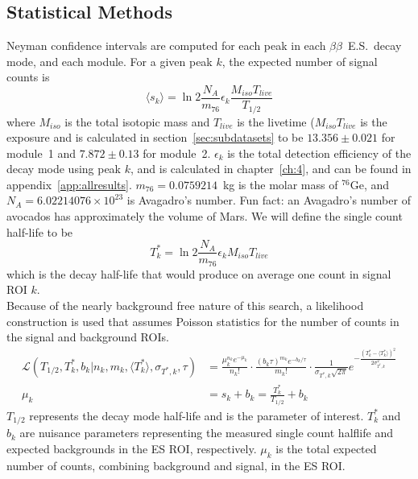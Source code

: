 \documentclass[notitlepage,rmp,aps,10pt]{revtex4-1}
\newcommand{\bb}{${\beta \beta}$}
\newcommand{\bbes}{\bb~E.S.}
\newcommand{\iso}[2]{$^{#1}$#2}
\newcommand{\Ge}[1]{\iso{#1}{Ge}}
\begin{document}
\subsection{Statistical Methods}
Neyman confidence intervals are computed for each peak in each \bbes\ decay mode, and each module.
For a given peak $k$, the expected number of signal counts is
\begin{equation}
  \langle s_k\rangle = \ln2 \frac{N_A}{m_{76}}\epsilon_k\frac{M_{iso}T_{live}}{T_{1/2}}
\end{equation}
where $M_{iso}$ is the total isotopic mass and $T_{live}$ is the livetime ($M_{iso}T_{live}$ is the exposure and is calculated in section~\ref{sec:subdatasets} to be $13.356\pm0.021$ for module~1 and $7.872\pm0.13$ for module~2.
$\epsilon_k$ is the total detection efficiency of the decay mode using peak $k$, and is calculated in chapter~\ref{ch:4}, and can be found in appendix~\ref{app:allresults}.
$m_{76}=0.0759214$~kg is the molar mass of \Ge{76}, and $N_A=6.02214076\times10^{23}$ is Avagadro's number.
Fun fact: an Avagadro's number of avocados has approximately the volume of Mars.
We will define the single count half-life to be
\begin{equation}
  T^*_k=\ln2 \frac{N_A}{m_{76}}\epsilon_kM_{iso}T_{live}
\end{equation}
which is the decay half-life that would produce on average one count in signal ROI $k$.
\\
Because of the nearly background free nature of this search, a likelihood construction is used that assumes Poisson statistics for the number of counts in the signal and background ROIs.
\begin{equation}
  \label{eq:rolke}
  \begin{aligned}
    \mathcal{L}(T_{1/2},T^*_k,b_k|n_k,m_k,\langle T^*_k\rangle, \sigma_{T^*,k},\tau)
    &=\frac{\mu_k^{n_k}e^{-\mu_k}}{n_k!} \cdot \frac{(b_k\tau)^{m_k}e^{-b_k/\tau}}{m_k!} \cdot
    \frac{1}{\sigma_{T^*,k}\sqrt{2\pi}}e^{-\frac{(T^*_k-\langle T^*_k\rangle)^2}{2\sigma_{T^*,k}^2}} \\
    \mu_k &= s_k+b_k = \frac{T^*_k}{T_{1/2}} + b_k
  \end{aligned}
\end{equation}
$T_{1/2}$ represents the decay mode half-life and is the parameter of interest.
$T^*_k$ and $b_k$ are nuisance parameters representing the measured single count halflife and expected backgrounds in the ES ROI, respectively.
$\mu_k$ is the total expected number of counts, combining background and signal, in the ES ROI.
\end{document}
